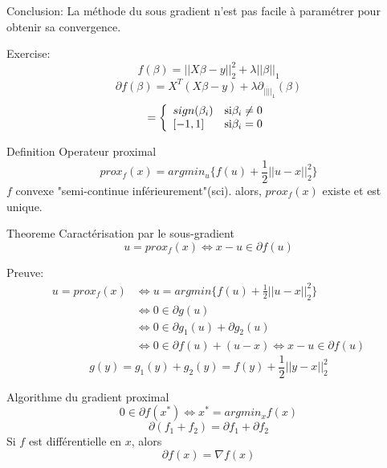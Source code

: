 \documentclass{article}
\begin{document}
Conclusion: La m\'ethode du sous gradient n'est pas facile \`a param\'etrer pour obtenir sa convergence.

Exercise: 
\begin{equation}
f(\beta)=||X\beta-y||_2^2+\lambda||\beta||_1
\end{equation}
\begin{equation}
\partial f(\beta)=X^T(X\beta-y)+\lambda\partial_{||\dot||_1}(\beta)
\end{equation}
\begin{equation}
[\partial_{||\dot||_1}(\beta)]=
\left\{\begin{array}{lll}
sign(\beta_i) &\text{si} \beta_i\neq 0\\ \relax
[-1,1] & \text{si} \beta_i=0
\end{array}\right.
\end{equation}

Definition Operateur proximal
\begin{equation}
prox_f(x)=argmin_u \{f(u)+\frac{1}{2}||u-x||_2^2\}
\end{equation}
$f$ convexe "semi-continue inf\'erieurement"(sci). alors, $prox_f(x)$ existe et est unique.

Theoreme Caract\'erisation par le sous-gradient
\begin{equation}
u=prox_f(x) \Leftrightarrow x-u \in \partial f(u)
\end{equation}

Preuve:
\begin{equation}
\begin{split}
u=prox_f(x) &\Leftrightarrow u=argmin \{f(u)+\frac{1}{2}||u-x||_2^2\}\\
&\Leftrightarrow 0\in \partial g(u)\\
&\Leftrightarrow 0\in \partial g_1(u)+\partial g_2(u)\\
&\Leftrightarrow 0\in \partial f(u) + (u-x) \Leftrightarrow x-u \in\partial f(u)
\end{split}
\end{equation}
\begin{equation}
g(y)=g_1(y)+g_2(y)=f(y)+\frac{1}{2}||y-x||_2^2
\end{equation}

Algorithme du gradient proximal
\begin{equation}
0\in\partial f(x^*) \Leftrightarrow x^*=argmin_x f(x)
\end{equation}
\begin{equation}
\partial (f_1+f_2)=\partial f_1+\partial f_2
\end{equation}
Si $f$ est diff\'erentielle en $x$, alors
\begin{equation}
\partial f(x) =\nabla f(x)
\end{equation}
\end{document}
